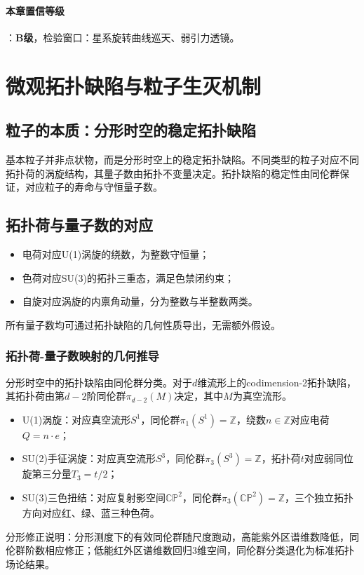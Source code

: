 \documentclass[12pt,a4paper,twocolumn]{article}
\begin{document}
\paragraph{本章置信等级}：\textbf{B级}，检验窗口：星系旋转曲线巡天、弱引力透镜。

\section{微观拓扑缺陷与粒子生灭机制}

\subsection{粒子的本质：分形时空的稳定拓扑缺陷}
基本粒子并非点状物，而是分形时空上的稳定拓扑缺陷。不同类型的粒子对应不同拓扑荷的涡旋结构，其量子数由拓扑不变量决定。拓扑缺陷的稳定性由同伦群保证，对应粒子的寿命与守恒量子数。

\subsection{拓扑荷与量子数的对应}
\begin{itemize}
\item 电荷对应U(1)涡旋的绕数，为整数守恒量；
\item 色荷对应SU(3)的拓扑三重态，满足色禁闭约束；
\item 自旋对应涡旋的内禀角动量，分为整数与半整数两类。
\end{itemize}
所有量子数均可通过拓扑缺陷的几何性质导出，无需额外假设。

\subsubsection{拓扑荷-量子数映射的几何推导}
分形时空中的拓扑缺陷由同伦群分类。对于$d$维流形上的codimension-2拓扑缺陷，其拓扑荷由第$d-2$阶同伦群$\pi_{d-2}(M)$决定，其中$M$为真空流形。
\begin{itemize}
\item U(1)涡旋：对应真空流形$S^1$，同伦群$\pi_1(S^1)=\mathbb{Z}$，绕数$n\in\mathbb{Z}$对应电荷$Q=n\cdot e$；
\item SU(2)手征涡旋：对应真空流形$S^3$，同伦群$\pi_3(S^3)=\mathbb{Z}$，拓扑荷$t$对应弱同位旋第三分量$T_3=t/2$；
\item SU(3)三色扭结：对应复射影空间$\mathbb{CP}^2$，同伦群$\pi_3(\mathbb{CP}^2)=\mathbb{Z}$，三个独立拓扑方向对应红、绿、蓝三种色荷。
\end{itemize}

分形修正说明：分形测度下的有效同伦群随尺度跑动，高能紫外区谱维数降低，同伦群阶数相应修正；低能红外区谱维数回归3维空间，同伦群分类退化为标准拓扑场论结果。
\end{document}
